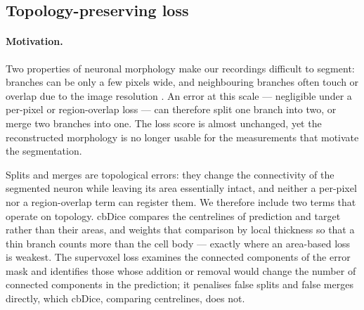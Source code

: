 \subsection{Topology-preserving loss}
\label{sec:met:loss}

\paragraph{Motivation.}
Two properties of neuronal morphology make our recordings difficult to
segment: branches can be only a few pixels wide, and neighbouring branches
often touch or overlap due to the image resolution
\cite{grim2025supervoxel}. An error at this scale --- negligible under a
per-pixel or region-overlap loss --- can therefore split one branch into
two, or merge two branches into one. The loss score is almost unchanged, yet
the reconstructed morphology is no longer usable for the measurements that
motivate the segmentation.

Splits and merges are topological errors: they change the connectivity of
the segmented neuron while leaving its area essentially intact, and neither
a per-pixel nor a region-overlap term can register them. We therefore
include two terms that operate on topology. cbDice \cite{shi2024cbdice}
compares the centrelines of prediction and target rather than their areas,
and weights that comparison by local thickness so that a thin branch counts
more than the cell body --- exactly where an area-based loss is weakest. The
supervoxel loss \cite{grim2025supervoxel} examines the connected components
of the error mask and identifies those whose addition or removal would
change the number of connected components in the prediction; it penalises
false splits and false merges directly, which cbDice, comparing centrelines,
does not.

